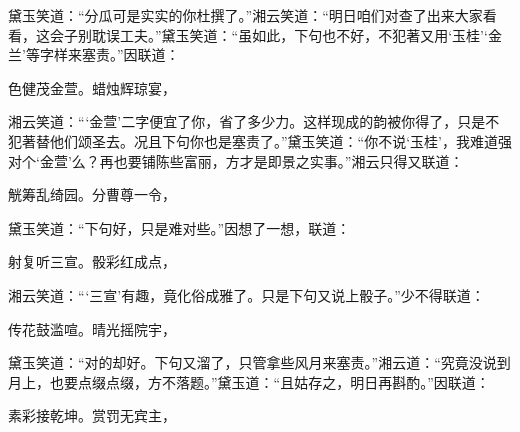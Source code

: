 \begin{parag}
    黛玉笑道：“分瓜可是实实的你杜撰了。”湘云笑道：“明日咱们对查了出来大家看看，这会子别耽误工夫。”黛玉笑道：“虽如此，下句也不好，不犯著又用‘玉桂’‘金兰’等字样来塞责。”因联道：
\end{parag}


\begin{poem}
    \begin{pl}色健茂金萱。蜡烛辉琼宴，\end{pl}
\end{poem}


\begin{parag}
    湘云笑道：“‘金萱’二字便宜了你，省了多少力。这样现成的韵被你得了，只是不犯著替他们颂圣去。况且下句你也是塞责了。”黛玉笑道：“你不说‘玉桂’，我难道强对个‘金萱’么？再也要铺陈些富丽，方才是即景之实事。”湘云只得又联道：
\end{parag}


\begin{poem}
    \begin{pl}觥筹乱绮园。分曹尊一令，\end{pl}
\end{poem}


\begin{parag}
    黛玉笑道：“下句好，只是难对些。”因想了一想，联道：
\end{parag}


\begin{poem}
    \begin{pl}射复听三宣。骰彩红成点，\end{pl}
\end{poem}


\begin{parag}
    湘云笑道：“‘三宣’有趣，竟化俗成雅了。只是下句又说上骰子。”少不得联道：
\end{parag}


\begin{poem}
    \begin{pl}传花鼓滥喧。晴光摇院宇，\end{pl}
\end{poem}


\begin{parag}
    黛玉笑道：“对的却好。下句又溜了，只管拿些风月来塞责。”湘云道：“究竟没说到月上，也要点缀点缀，方不落题。”黛玉道：“且姑存之，明日再斟酌。”因联道：
\end{parag}


\begin{poem}
    \begin{pl}素彩接乾坤。赏罚无宾主，\end{pl}
\end{poem}


